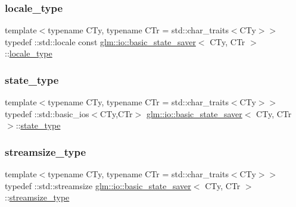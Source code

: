 \subsubsection{\texorpdfstring{locale\+\_\+type}{locale\_type}}
{\footnotesize\ttfamily template$<$typename C\+Ty, typename C\+Tr = std\+::char\+\_\+traits$<$\+C\+Ty$>$$>$ \\
typedef \+::std\+::locale const \mbox{\hyperlink{classglm_1_1io_1_1basic__state__saver}{glm\+::io\+::basic\+\_\+state\+\_\+saver}}$<$ C\+Ty, C\+Tr $>$\+::\mbox{\hyperlink{classglm_1_1io_1_1basic__state__saver_acc657f13df9c1fd68e1014b96ff615cb}{locale\+\_\+type}}\hspace{0.3cm}{\ttfamily [private]}}

\mbox{\label{classglm_1_1io_1_1basic__state__saver_a84787cc03192543bfe67ef25e7f20aa6}} 
\subsubsection{\texorpdfstring{state\+\_\+type}{state\_type}}
{\footnotesize\ttfamily template$<$typename C\+Ty, typename C\+Tr = std\+::char\+\_\+traits$<$\+C\+Ty$>$$>$ \\
typedef \+::std\+::basic\+\_\+ios$<$C\+Ty,C\+Tr$>$ \mbox{\hyperlink{classglm_1_1io_1_1basic__state__saver}{glm\+::io\+::basic\+\_\+state\+\_\+saver}}$<$ C\+Ty, C\+Tr $>$\+::\mbox{\hyperlink{classglm_1_1io_1_1basic__state__saver_a84787cc03192543bfe67ef25e7f20aa6}{state\+\_\+type}}\hspace{0.3cm}{\ttfamily [private]}}

\mbox{\label{classglm_1_1io_1_1basic__state__saver_a0a4c44df9a4fcf7531af6da7698e0931}} 
\subsubsection{\texorpdfstring{streamsize\+\_\+type}{streamsize\_type}}
{\footnotesize\ttfamily template$<$typename C\+Ty, typename C\+Tr = std\+::char\+\_\+traits$<$\+C\+Ty$>$$>$ \\
typedef \+::std\+::streamsize \mbox{\hyperlink{classglm_1_1io_1_1basic__state__saver}{glm\+::io\+::basic\+\_\+state\+\_\+saver}}$<$ C\+Ty, C\+Tr $>$\+::\mbox{\hyperlink{classglm_1_1io_1_1basic__state__saver_a0a4c44df9a4fcf7531af6da7698e0931}{streamsize\+\_\+type}}\hspace{0.3cm}{\ttfamily [private]}}




